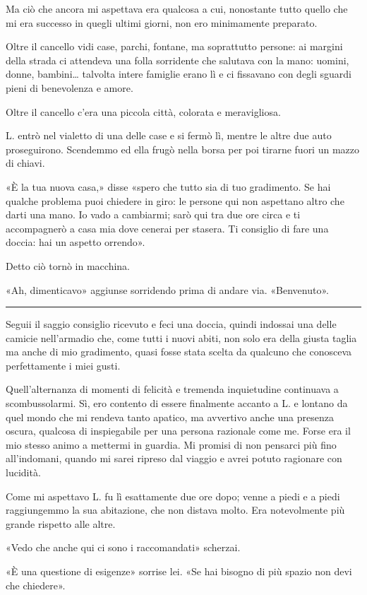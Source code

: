 Ma ciò che ancora mi aspettava era qualcosa a cui, nonostante tutto quello che mi era successo in
quegli ultimi giorni, non ero minimamente preparato.

Oltre il cancello vidi case, parchi, fontane, ma soprattutto persone: ai margini della strada ci
attendeva una folla sorridente che salutava con la mano: uomini, donne, bambini\dots{} talvolta
intere famiglie erano lì e ci fissavano con degli sguardi pieni di benevolenza e amore.

Oltre il cancello c'era una piccola città, colorata e meravigliosa.

L. entrò nel vialetto di una delle case e si fermò lì, mentre le altre due auto proseguirono.
Scendemmo ed ella frugò nella borsa per poi tirarne fuori un mazzo di chiavi.

«È la tua nuova casa,» disse «spero che tutto sia di tuo gradimento. Se hai qualche problema puoi
chiedere in giro: le persone qui non aspettano altro che darti una mano. Io vado a cambiarmi; sarò
qui tra due ore circa e ti accompagnerò a casa mia dove cenerai per stasera. Ti consiglio di fare
una doccia: hai un aspetto orrendo».

Detto ciò tornò in macchina.

«Ah, dimenticavo» aggiunse sorridendo prima di andare via. «Benvenuto».

\plainbreak{1}

Seguii il saggio consiglio ricevuto e feci una doccia, quindi indossai una delle camicie
nell'armadio che, come tutti i nuovi abiti, non solo era della giusta taglia ma anche di mio
gradimento, quasi fosse stata scelta da qualcuno che conosceva perfettamente i miei gusti.

Quell'alternanza di momenti di felicità e tremenda inquietudine continuava a scombussolarmi. Sì, ero
contento di essere finalmente accanto a L. e lontano da quel mondo che mi rendeva tanto apatico, ma
avvertivo anche una presenza oscura, qualcosa di inspiegabile per una persona razionale come me.
Forse era il mio stesso animo a mettermi in guardia. Mi promisi di non pensarci più fino
all'indomani, quando mi sarei ripreso dal viaggio e avrei potuto ragionare con lucidità.

Come mi aspettavo L. fu lì esattamente due ore dopo; venne a piedi e a piedi raggiungemmo la sua
abitazione, che non distava molto. Era notevolmente più grande rispetto alle altre.

«Vedo che anche qui ci sono i raccomandati» scherzai.

«È una questione di esigenze» sorrise lei. «Se hai bisogno di più spazio non devi che chiedere».

